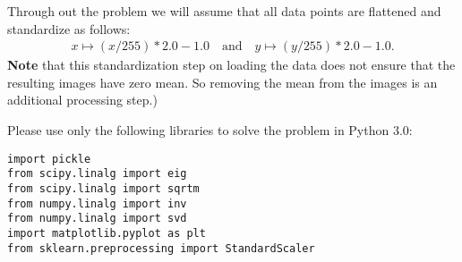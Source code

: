 \documentclass[preview]{standalone}
\begin{document}
Through out the problem we will assume that all data points are flattened and standardize as follows: 
\begin{align*}
	x \mapsto (x/255)*2.0 - 1.0 \quad\text{and}\quad	y \mapsto (y/255)*2.0 - 1.0.
\end{align*}
{\bf Note} that this standardization step on loading the data does not ensure that
the resulting images have zero mean. So removing the mean from the images is
an additional processing step.) 

Please use only the following libraries to solve the problem in Python 3.0:

\begin{lstlisting}
import pickle
from scipy.linalg import eig
from scipy.linalg import sqrtm
from numpy.linalg import inv
from numpy.linalg import svd
import matplotlib.pyplot as plt
from sklearn.preprocessing import StandardScaler
\end{lstlisting}
\end{document}
